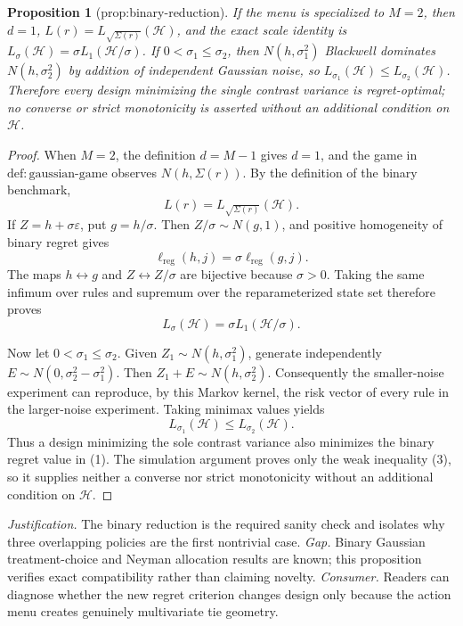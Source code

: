 \documentclass{article}
\newtheorem{proposition}{Proposition}
\begin{document}
\begin{proposition}[prop:binary-reduction]\label{prop:binary-reduction}
If the menu is specialized to \(M=2\), then \(d=1\), \(L(r)=L_{\sqrt{\Sigma(r)}}(\mathcal H)\), and the exact scale identity is \(L_{\sigma}(\mathcal H)=\sigma L_1(\mathcal H/\sigma)\). If \(0<\sigma_1\le\sigma_2\), then \(N(h,\sigma_1^2)\) Blackwell dominates \(N(h,\sigma_2^2)\) by addition of independent Gaussian noise, so \(L_{\sigma_1}(\mathcal H)\le L_{\sigma_2}(\mathcal H)\). Therefore every design minimizing the single contrast variance is regret-optimal; no converse or strict monotonicity is asserted without an additional condition on \(\mathcal H\).
\end{proposition}
\begin{proof}
When \(M=2\), the definition \(d=M-1\) gives \(d=1\), and the game in \(\mathrm{def:gaussian\text{-}game}\) observes \(N(h,\Sigma(r))\).  By the definition of the binary benchmark,
\[
 L(r)=L_{\sqrt{\Sigma(r)}}(\mathcal H).                              \tag{1}
\]
If \(Z=h+\sigma\varepsilon\), put \(g=h/\sigma\).  Then \(Z/\sigma\sim N(g,1)\), and positive homogeneity of binary regret gives
\[
 \ell_{\mathrm{reg}}(h,j)=\sigma\ell_{\mathrm{reg}}(g,j).
\]
The maps \(h\leftrightarrow g\) and \(Z\leftrightarrow Z/\sigma\) are bijective because \(\sigma>0\).  Taking the same infimum over rules and supremum over the reparameterized state set therefore proves
\[
 L_\sigma(\mathcal H)=\sigma L_1(\mathcal H/\sigma).                \tag{2}
\]

Now let \(0<\sigma_1\leq\sigma_2\).  Given \(Z_1\sim N(h,\sigma_1^2)\), generate independently \(E\sim N(0,\sigma_2^2-\sigma_1^2)\).  Then \(Z_1+E\sim N(h,\sigma_2^2)\).  Consequently the smaller-noise experiment can reproduce, by this Markov kernel, the risk vector of every rule in the larger-noise experiment.  Taking minimax values yields
\[
 L_{\sigma_1}(\mathcal H)\leq L_{\sigma_2}(\mathcal H).            \tag{3}
\]
Thus a design minimizing the sole contrast variance also minimizes the binary regret value in (1).  The simulation argument proves only the weak inequality (3), so it supplies neither a converse nor strict monotonicity without an additional condition on \(\mathcal H\).
\end{proof}
\par\smallskip\noindent \textit{Justification.} The binary reduction is the required sanity check and isolates why three overlapping policies are the first nontrivial case. \textit{Gap.} Binary Gaussian treatment-choice and Neyman allocation results are known; this proposition verifies exact compatibility rather than claiming novelty. \textit{Consumer.} Readers can diagnose whether the new regret criterion changes design only because the action menu creates genuinely multivariate tie geometry.
\end{document}
